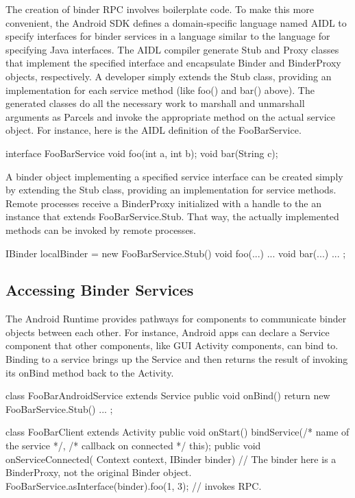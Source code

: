 \documentclass[prodmode]{acmlarge}
\begin{document}
The creation of binder RPC involves boilerplate code. To make this more convenient, the Android SDK defines a domain-specific language named AIDL to specify interfaces for binder services in a language similar to the language for specifying Java interfaces. The AIDL compiler generate Stub and Proxy classes that implement the specified interface and encapsulate Binder and BinderProxy objects, respectively. A developer simply extends the Stub class, providing an implementation for each service method (like foo() and bar() above). The generated classes do all the necessary work to marshall and unmarshall arguments as Parcels and invoke the appropriate method on the actual service object. For instance, here is the AIDL definition of the FooBarService.

\begin{snippet}
interface FooBarService { void foo(int a, int b); void bar(String c); }
\end{snippet}

A binder object implementing a specified service interface can be created simply by extending the Stub class, providing an implementation for service methods. Remote processes receive a BinderProxy initialized with a handle to the an instance that extends FooBarService.Stub. That way, the actually implemented methods can be invoked by remote processes.

\begin{snippet}
IBinder localBinder = new FooBarService.Stub() { void foo(...) { ... }
                                                 void bar(...) { ... } };
\end{snippet}

\subsection{Accessing Binder Services}
The Android Runtime provides pathways for components to communicate binder objects between each other. For instance, Android apps can declare a Service component that other components, like GUI Activity components, can bind to. Binding to a service brings up the Service and then returns the result of invoking its onBind method back to the Activity.

\begin{snippet}
class FooBarAndroidService extends Service {
  public void onBind() { return new FooBarService.Stub() { ... }; }
}

class FooBarClient extends Activity {
  public void onStart() { bindService(/* name of the service */,
                                      /* callback on connected */ this);
  }
  public void onServiceConnected(
    Context context, IBinder binder) {
    // The binder here is a BinderProxy, not the original Binder object.
    FooBarService.asInterface(binder).foo(1, 3);  // invokes RPC.
  }
}
\end{snippet}
\end{document}

